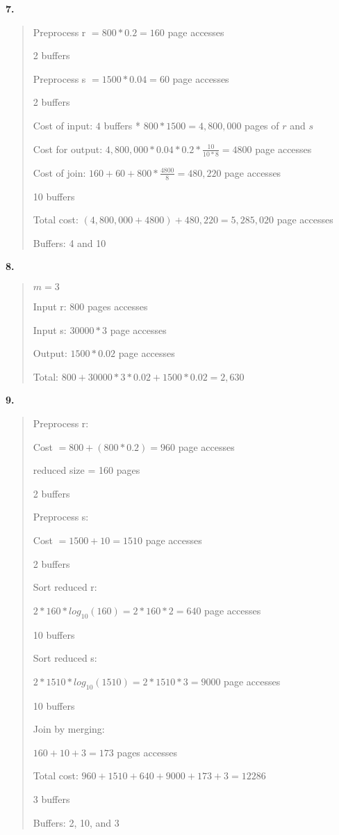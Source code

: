 \documentclass{article}
\begin{document}
\textbf{7.}
\begin{quote}

Preprocess r $= 800 * 0.2 = 160$ page accesses

2 buffers

Preprocess s $= 1500 * 0.04 = 60$ page accesses

2 buffers

Cost of input: $4$ buffers * $800 * 1500 = 4,800,000$ pages of $r$ and $s$

Cost for output: $4,800,000 * 0.04 * 0.2 * \frac{10}{10*8} =  4800$  page accesses

Cost of join: $160 + 60 + 800 * \frac{4800}{8} = 480,220$ page accesses

10 buffers

Total cost: $(4,800,000 + 4800) + 480,220 = 5,285,020$ page accesses

Buffers: 4 and 10

\end{quote}

\textbf{8.}
\begin{quote}

$m = 3$

Input r: 800 pages accesses

Input s: $30000 * 3$ page accesses

Output: $1500 * 0.02$ page accesses

Total: $800 + 30000 * 3 * 0.02 + 1500 * 0.02 = 2,630$

\end{quote}

\textbf{9.}
\begin{quote}

Preprocess r: 

Cost $= 800 + (800 * 0.2) = 960$ page accesses

reduced size = 160 pages

2 buffers

Preprocess s:

Cost $= 1500+10=1510$ page accesses

2 buffers

Sort reduced r:

$2 * 160 * log_{10}(160) = 2 * 160 * 2 = 640$ page accesses

10 buffers

Sort reduced s:

$2 * 1510 * log_{10}(1510) = 2 * 1510 * 3 = 9000$ page accesses

10 buffers

Join by merging:

$160+10+3=173$ pages accesses

Total cost: $960+1510+640+9000+173+3=12286$

3 buffers

Buffers: 2, 10, and 3

\end{quote}
\end{document}
